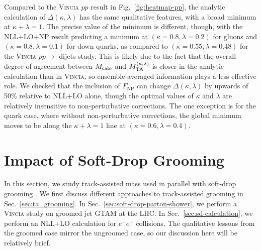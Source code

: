 \documentclass[letterpaper,11pt]{article}
\newcommand{\Fig}[1]{Fig.~\ref{#1}}
\newcommand{\Sec}[1]{Sec.~\ref{#1}}
\begin{document}
Compared to the \textsc{Vincia} $pp$ result in \Fig{fig:heatmap-pp}, the analytic calculation of $\Delta(\kappa,\lambda)$ has the same qualitative features, with a broad minimum at $\kappa + \lambda = 1$.
%
The precise value of the minimum is different, though, with the NLL+LO+NP result predicting a minimum at $(\kappa=0.8,\lambda = 0.2)$ for gluons and $(\kappa=0.8,\lambda = 0.1)$ for down quarks, as compared to $(\kappa=0.55,\lambda=0.48)$ for the \textsc{Vincia} $pp\rightarrow $ dijets study. 
%
This is likely due to the fact that the overall degree of agreement between $M_{\rm calo}$ and $M_{\rm TA}^{(\kappa,\lambda)}$ is closer in the analytic calculation than in \textsc{Vincia}, so ensemble-averaged information plays a less effective role.
%
We checked that the inclusion of $F_\text{NP}$ can change $\Delta(\kappa,\lambda)$ by upwards of 50\% relative to NLL+LO alone, though the optimal values of $\kappa$ and $\lambda$ are relatively insensitive to non-perturbative corrections.
%
The one exception is for the quark case, where without non-perturbative corrections, the global minimum moves to be along the $\kappa + \lambda = 1$ line at $(\kappa=0.6,\lambda = 0.4)$.





















\section{Impact of Soft-Drop Grooming}
\label{sec:soft-drop}

In this section, we study track-assisted mass used in parallel with soft-drop grooming \cite{Larkoski:2014wba}. 
%
We first discuss different approaches to track-assisted grooming in \Sec{sec:ta_grooming}. 
%
In \Sec{sec:soft-drop-parton-shower}, we perform a \textsc{Vincia} study on groomed jet GTAM at the LHC.
%
In \Sec{sec:sd-calculation}, we perform an NLL+LO calculation for $e^+e^-$ collisions.
%
The qualitative lessons from the groomed case mirror the ungroomed case, so our discussion here will be relatively brief.
\end{document}
